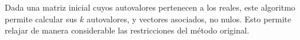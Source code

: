 \vspace{1em}
Dada una matriz inicial cuyos autovalores pertenecen a los reales, este algoritmo permite calcular sus $k$ autovalores, y vectores asociados, no nulos. Esto permite relajar de manera considerable las restricciones del método original.




% 


